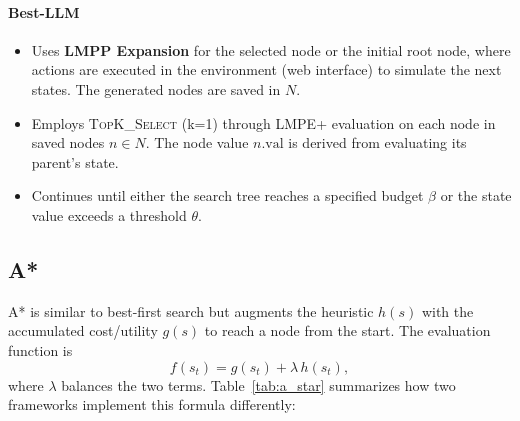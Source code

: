 \paragraph{Best-LLM 
 \citep{koh2024tree}}
\begin{itemize}
    \item Uses \textbf{LMPP Expansion} for the selected node or the initial root node, where actions are executed in the environment (web interface) to simulate the next states. The generated nodes are saved in $N$.
    
    \item Employs \textsc{TopK\_Select} (k=1) through LMPE+ evaluation on each node in saved nodes \(n \in N\). The node value \(n.\text{val}\) is derived from evaluating its parent’s state.
    
    \item Continues until either the search tree reaches a specified budget \(\beta\) or the state value exceeds a threshold \(\theta\).
\end{itemize}


\subsection{A*}
\label{sec:a_star}
A* is similar to best-first search but augments the heuristic \(h(s)\) with the accumulated cost/utility \(g(s)\) to reach a node from the start. The evaluation function is
\begin{equation}
    f(s_t) = g(s_t) + \lambda \, h(s_t),
    \label{eq:eval_a_star}
\end{equation}
where \(\lambda\) balances the two terms. Table~\ref{tab:a_star} summarizes how two frameworks implement this formula differently:

